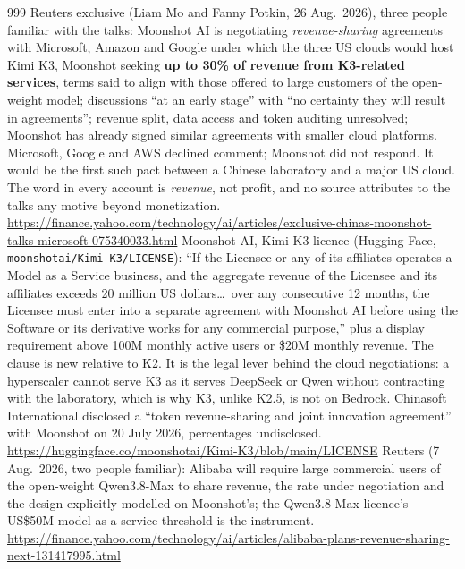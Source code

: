 \begin{thebibliography}{999}
 Reuters exclusive (Liam Mo and Fanny Potkin, 26 Aug.\ 2026), three people familiar with the talks: Moonshot AI is negotiating \emph{revenue-sharing} agreements with Microsoft, Amazon and Google under which the three US clouds would host Kimi K3, Moonshot seeking \textbf{up to 30\% of revenue from K3-related services}, terms said to align with those offered to large customers of the open-weight model; discussions ``at an early stage'' with ``no certainty they will result in agreements''; revenue split, data access and token auditing unresolved; Moonshot has already signed similar agreements with smaller cloud platforms. Microsoft, Google and AWS declined comment; Moonshot did not respond. It would be the first such pact between a Chinese laboratory and a major US cloud. The word in every account is \emph{revenue}, not profit, and no source attributes to the talks any motive beyond monetization. \url{https://finance.yahoo.com/technology/ai/articles/exclusive-chinas-moonshot-talks-microsoft-075340033.html}
 Moonshot AI, Kimi K3 licence (Hugging Face, \texttt{moonshotai/Kimi-K3/LICENSE}): ``If the Licensee or any of its affiliates operates a Model as a Service business, and the aggregate revenue of the Licensee and its affiliates exceeds 20 million US dollars\ldots\ over any consecutive 12 months, the Licensee must enter into a separate agreement with Moonshot AI before using the Software or its derivative works for any commercial purpose,'' plus a display requirement above 100M monthly active users or \$20M monthly revenue. The clause is new relative to K2. It is the legal lever behind the cloud negotiations: a hyperscaler cannot serve K3 as it serves DeepSeek or Qwen without contracting with the laboratory, which is why K3, unlike K2.5, is not on Bedrock. Chinasoft International disclosed a ``token revenue-sharing and joint innovation agreement'' with Moonshot on 20 July 2026, percentages undisclosed. \url{https://huggingface.co/moonshotai/Kimi-K3/blob/main/LICENSE}
 Reuters (7 Aug.\ 2026, two people familiar): Alibaba will require large commercial users of the open-weight Qwen3.8-Max to share revenue, the rate under negotiation and the design explicitly modelled on Moonshot's; the Qwen3.8-Max licence's US\$50M model-as-a-service threshold is the instrument. \url{https://finance.yahoo.com/technology/ai/articles/alibaba-plans-revenue-sharing-next-131417995.html}

\end{thebibliography}
